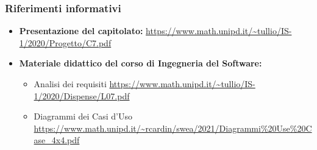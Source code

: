 \subsubsection{Riferimenti informativi}
\begin{itemize}
\item \textbf{Presentazione del capitolato:}\newline
      \url{https://www.math.unipd.it/~tullio/IS-1/2020/Progetto/C7.pdf}
\item \textbf{Materiale didattico del corso di Ingegneria del Software:}
    \begin{itemize}
    \item Analisi dei requisiti\newline
      \url{https://www.math.unipd.it/~tullio/IS-1/2020/Dispense/L07.pdf}
    \item Diagrammi dei Casi d'Uso\newline
      \url{https://www.math.unipd.it/~rcardin/swea/2021/Diagrammi\%20Use\%20Case_4x4.pdf}
    \end{itemize}
\end{itemize}
